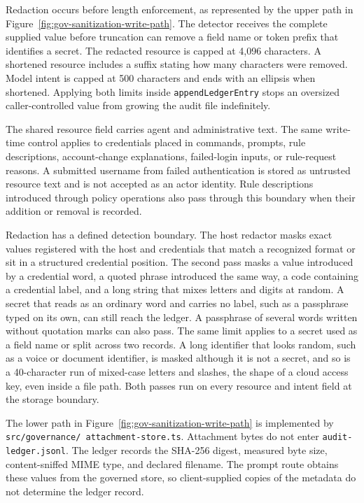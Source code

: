 Redaction occurs before length enforcement, as represented by the upper path in
Figure~\ref{fig:gov-sanitization-write-path}. The detector receives the complete supplied value before truncation can remove a field name or token prefix that identifies a secret. The redacted resource is capped at 4,096 characters. A shortened resource includes a suffix stating how many characters were removed. Model intent is capped at 500 characters and ends with an ellipsis when shortened. Applying both limits inside \texttt{appendLedgerEntry} stops an oversized caller-controlled value from growing the audit file indefinitely.

The shared resource field carries agent and administrative text. The same write-time control applies to credentials placed in commands, prompts, rule descriptions, account-change explanations, failed-login inputs, or rule-request reasons. A submitted username from failed authentication is stored as untrusted resource text and is not accepted as an actor identity. Rule descriptions introduced through policy operations also pass through this boundary when their addition or removal is recorded.

{\color{red}Redaction has a defined detection boundary. The host redactor masks
exact values registered with the host and credentials that match a recognized
format or sit in a structured credential position. The second pass masks a
value introduced by a credential word, a quoted phrase introduced the same
way, a code containing a credential label, and a long string that mixes
letters and digits at random. A secret that reads as an ordinary word and
carries no label, such as a passphrase typed on its own, can still reach the
ledger. A passphrase of several words written without quotation marks can
also pass. The same limit applies to a secret used as a field name or split
across two records.
A long identifier that looks random, such as a voice or document identifier,
is masked although it is not a secret, and so is a 40-character run of
mixed-case letters and slashes, the shape of a cloud access key, even inside a
file path. Both passes run on every resource and intent field at the storage
boundary.}

The lower path in Figure~\ref{fig:gov-sanitization-write-path} is implemented by
\texttt{src/governance/ \break attachment-store.ts}. Attachment bytes do not enter
\texttt{audit-ledger.jsonl}. The ledger records the SHA-256 digest, measured byte size, content-sniffed MIME type, and declared filename. The prompt route obtains these values from the governed store, so client-supplied copies of the metadata do not determine the ledger record.

